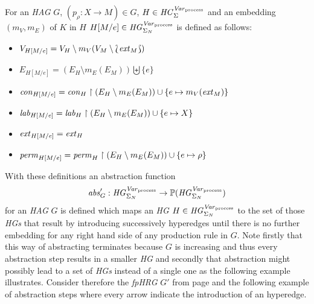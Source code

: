 	\begin{definition}
		For an \emph{\ac{HAG}} $G$, $(p_{\rho}\colon X\rightarrow M)\in G$,
		$H\in\mathit{HC}_{\Sigma}^{\mathit{Var}_{\text{process}}}$ and an embedding $(m_{V}, m_{E})$ of $K$ in $H$
		$H[M/e]\in\mathit{HG}_{\Sigma_{N}}^{\mathit{Var}_{\text{process}}}$ is defined as follows:
		\begin{itemize}
			\item $V_{H[M/e]} = V_{H}\setminus m_{V}(V_{M}\setminus \Lbag
				\mathit{ext}_{M}\Rbag)$
			\item $E_{H[M/e]} = (E_{H}\setminus m_{E}(E_{M}))\biguplus \{e\}$
			\item $\mathit{con}_{H[M/e]} = \mathit{con}_{H}\upharpoonright
				(E_{H}\setminus m_{E}(E_{M})) \cup \{e\mapsto m_V(\mathit{ext}_{M})\}$
			\item $\mathit{lab}_{H[M/e]} = \mathit{lab}_{H}\upharpoonright (E_{H}
				\setminus m_{E}(E_{M})) \cup \{e\mapsto X\}$
			\item $\mathit{ext}_{H[M/e]} = \mathit{ext}_{H}$
			\item $\mathit{perm}_{H[M/e]} = \mathit{perm}_{H}\upharpoonright (E_{H}
				\setminus m_{E}(E_{M}))\cup \{e\mapsto \rho\}$
		\end{itemize}
	\end{definition}
	With these definitions an abstraction function
	\begin{equation*}
		\mathit{abs}_{G}':\mathit{HG}_{\Sigma_{N}}^{\mathit{Var}_{\text{process}}} \rightarrow\mathbb{P}(\mathit{HG}_{\Sigma_{N}}^{\mathit{Var}_{\text{process}}})
	\end{equation*}
	for an \emph{\ac{HAG}} $G$ is defined which maps an \emph{\ac{HG}}
	$H\in\mathit{HG}_{\Sigma_{N}}^{\mathit{Var}_{\text{process}}}$ to the set of those \emph{\acp{HG}} that result by introducing
	successively hyperedges until there is no further embedding for any right
	hand side of any production rule in $G$. Note firstly that this way of
	abstracting terminates because $G$ is increasing and thus every abstraction
	step results in a smaller \emph{\ac{HG}} and secondly that abstraction
	might possibly lead to a set of \emph{\acp{HG}} instead of a single one as
	the following example illustrates. Consider therefore the \emph{\ac{fpHRG}}
	$G'$ from page \pageref{eq:G'} and the following example of abstraction
	steps where every arrow indicate the introduction of an hyperedge.
	\begin{center}
	\end{center}
